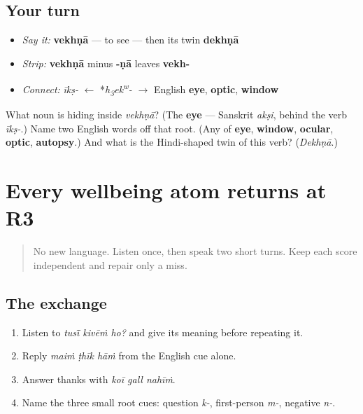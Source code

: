 \subsection*{Your turn}
\begin{itemize}
\raggedright
  \item \emph{Say it:} \textbf{vekhṇā} — to see — then its twin \textbf{dekhṇā}
  \item \emph{Strip:} \textbf{vekhṇā} minus \textbf{-ṇā} leaves \textbf{vekh-}
  \item \emph{Connect:} \emph{īkṣ-} $\leftarrow$ *\emph{h\textsubscript{3}ek\textsuperscript{w}-} $\to$ English \textbf{eye}, \textbf{optic}, \textbf{window}
\end{itemize}

\begin{tcolorbox}[breakable,colback=teal!4,colframe=teal!35!black,title={Before you move on}]
What noun is hiding inside \emph{vekhṇā}? (The \textbf{eye} — Sanskrit \emph{akṣi}, behind the verb \emph{īkṣ-}.) Name two English words off that root. (Any of \textbf{eye}, \textbf{window}, \textbf{ocular}, \textbf{optic}, \textbf{autopsy}.) And what is the Hindi-shaped twin of this verb? (\emph{Dekhṇā}.)
\end{tcolorbox}
\section[Practice]{Every wellbeing atom returns at R3}

\label{lesson:PA-R07-wellbeing-r3}



\begin{quote}
No new language. Listen once, then speak two short turns. Keep each score independent and repair only a miss.
\end{quote}

\subsection*{The exchange}
\begin{enumerate}
\raggedright
  \item Listen to \emph{tusī̃ kivēṁ ho?} and give its meaning before repeating it.
  \item Reply \emph{maiṁ ṭhīk hāṁ} from the English cue alone.
  \item Answer thanks with \emph{koī gall nahīṁ}.
  \item Name the three small root cues: question \emph{k-}, first-person \emph{m-}, negative \emph{n-}.
\end{enumerate}

